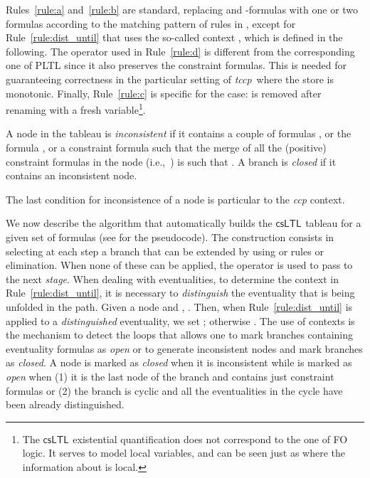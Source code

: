 \documentclass[american]{new_tlp}
\newcommand*{\ccp}{\textit{ccp}}
\newcommand*{\csltl}[1][]{\ensuremath{\textsf{csLTL}_{#1}}}
\newcommand*{\pltl}{\textsf{PLTL}}
\newcommand*{\tccp}{\textit{tccp}}
\providecommand*{\ie}   {i.e.,}
\begin{document}
Rules~\ref{rule:a} and~\ref{rule:b} are standard, replacing  and
-formulas with one or two formulas according to the matching pattern
of rules in , except for
Rule~\ref{rule:dist_until} that uses the so-called context ,
which is defined in the following.  The  operator used in
Rule~\ref{rule:d} is different from the corresponding one of \pltl{} since
it also preserves the constraint formulas.  This is needed for guaranteeing
correctness in the particular setting of \tccp\ where the store is
monotonic.  Finally, Rule~\ref{rule:c} is specific for the  case:
 is removed after renaming  with a fresh variable\footnote{The
\csltl{} existential quantification does not correspond to the one of FO
logic.  It serves to model local variables, and  can be
seen just as  where the information about  is local.  }.
\begin{definition}\label{def:node-inconsistent}
    A node in the tableau is \emph{inconsistent} if it contains a couple of
    formulas , or the formula , or a constraint
    formula  such that the merge  of all the (positive)
    constraint formulas  in the node (\ie\ ) is such that .  A branch is
    \emph{closed} if it contains an inconsistent node.
\end{definition}
The last condition for inconsistence of a node is particular to the \ccp{}
context.

We now describe the algorithm that automatically builds the \csltl{}
tableau for a given set of formulas  (see \cite{CominiTV14-techrep}
for the pseudocode).  The construction consists in selecting at each step a
branch that can be extended by using  or  rules or 
elimination.  When none of these can be applied, the  operator
is used to pass to the next \emph{stage}.  When dealing with eventualities,
to determine the context  in Rule~\ref{rule:dist_until}, it
is necessary to \emph{distinguish} the eventuality that is being unfolded
in the path.  Given a node  and , .  Then, when Rule~\ref{rule:dist_until} is applied
to a \emph{distinguished} eventuality, we set ; otherwise .  The use of contexts is the mechanism to detect the loops that
allows one to mark branches containing eventuality formulas as \emph{open}
or to generate inconsistent nodes and mark branches as \emph{closed}.  A
node is marked as \emph{closed} when it is inconsistent while is marked as
\emph{open} when (1) it is the last node of the branch and contains just
constraint formulas or (2) the branch is cyclic and all the eventualities
in the cycle have been already distinguished.
\end{document}
